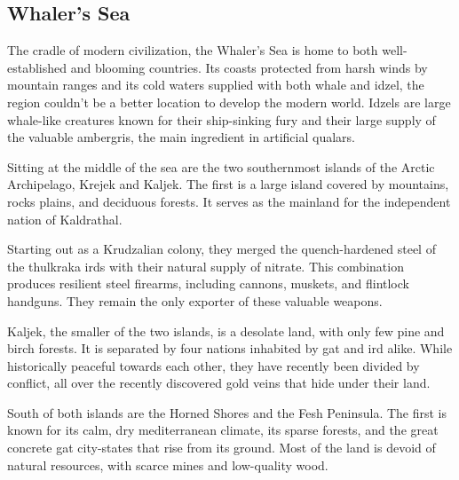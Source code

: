 

\subsection*{Whaler's Sea} \label{ssec::whalerssea}

The cradle of modern civilization, the Whaler's Sea is home to both well-established and blooming countries.
Its coasts protected from harsh winds by mountain ranges and its cold waters supplied with both whale and idzel, the region couldn't be a better location to develop the modern world.
Idzels are large whale-like creatures known for their ship-sinking fury and their large supply of the valuable ambergris, the main ingredient in artificial qualars.

Sitting at the middle of the sea are the two southernmost islands of the Arctic Archipelago, Krejek and Kaljek.
The first is a large island covered by mountains, rocks plains, and deciduous forests.
It serves as the mainland for the independent nation of Kaldrathal.

Starting out as a Krudzalian colony, they merged the quench-hardened steel of the thulkraka irds with their natural supply of nitrate.
This combination produces resilient steel firearms, including cannons, muskets, and flintlock handguns.
They remain the only exporter of these valuable weapons.

Kaljek, the smaller of the two islands, is a desolate land, with only few pine and birch forests.
It is separated by four nations inhabited by gat and ird alike.
While historically peaceful towards each other, they have recently been divided by conflict, all over the recently discovered gold veins that hide under their land.

South of both islands are the Horned Shores and the Fesh Peninsula.
The first is known for its calm, dry mediterranean climate, its sparse forests, and the great concrete gat city-states that rise from its ground.
Most of the land is devoid of natural resources, with scarce mines and low-quality wood.

